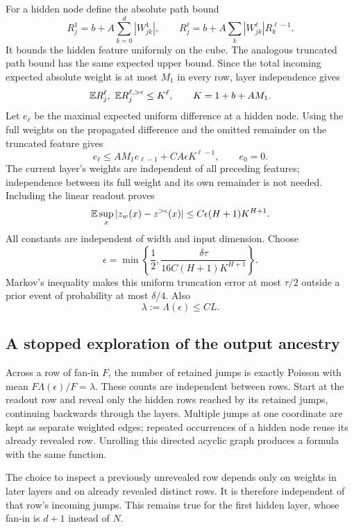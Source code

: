 For a hidden node define the absolute path bound
\[
 R_j^1=b+A\sum_{k=0}^d|W^1_{jk}|,
 \qquad
 R_j^\ell=b+A\sum_k|W^\ell_{jk}|R_k^{\ell-1}.
\]
It bounds the hidden feature uniformly on the cube. The analogous truncated path bound has the same expected upper bound. Since the total incoming expected absolute weight is at most $M_1$ in every row, layer independence gives
\[
 \mathbb E R_j^\ell,\ \mathbb E R_j^{\ell,>\epsilon}\le K^\ell,
 \qquad K=1+b+AM_1.
\]
Let $e_\ell$ be the maximal expected uniform difference at a hidden node. Using the full weights on the propagated difference and the omitted remainder on the truncated feature gives
\[
 e_\ell\le AM_1e_{\ell-1}+CA\epsilon K^{\ell-1},
 \qquad e_0=0.
\]
The current layer's weights are independent of all preceding features; independence between its full weight and its own remainder is not needed. Including the linear readout proves
\begin{equation}
 \mathbb E\sup_x|z_w(x)-z^{>\epsilon}(x)|
       \le C\epsilon(H+1)K^{H+1}.
 \label{eq:levy-truncation-uniform}
\end{equation}
All constants are independent of width and input dimension. Choose
\[
 \epsilon=\min\left\{\frac12,
          \frac{\delta\tau}{16C(H+1)K^{H+1}}\right\}.
\]
Markov's inequality makes this uniform truncation error at most $\tau/2$ outside a prior event of probability at most $\delta/4$. Also
\begin{equation}
 \lambda:=\Lambda(\epsilon)\le C L.
 \label{eq:levy-row-intensity}
\end{equation}

\subsection{A stopped exploration of the output ancestry}
Across a row of fan-in $F$, the number of retained jumps is exactly Poisson with mean $F\Lambda(\epsilon)/F=\lambda$. These counts are independent between rows. Start at the readout row and reveal only the hidden rows reached by its retained jumps, continuing backwards through the layers. Multiple jumps at one coordinate are kept as separate weighted edges; repeated occurrences of a hidden node reuse its already revealed row. Unrolling this directed acyclic graph produces a formula with the same function.

The choice to inspect a previously unrevealed row depends only on weights in later layers and on already revealed distinct rows. It is therefore independent of that row's incoming jumps. This remains true for the first hidden layer, whose fan-in is $d+1$ instead of $N$.

